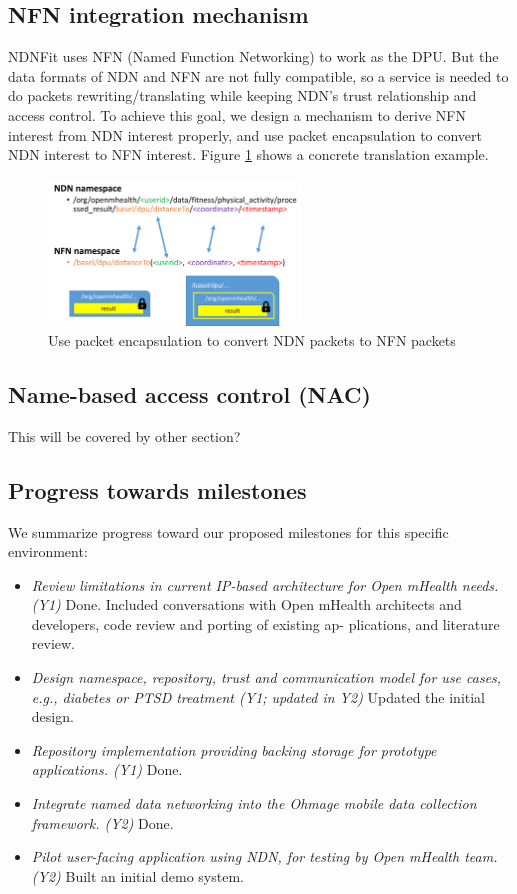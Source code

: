 \documentclass{article}
\begin{document}
\subsection{NFN integration mechanism}
NDNFit uses NFN (Named Function Networking) to work as the DPU. But the data formats of NDN and NFN are not fully compatible, so a service is needed to do packets rewriting/translating while keeping NDN’s trust relationship and access control. To achieve this goal, we design a mechanism to derive NFN interest from NDN interest properly, and use packet encapsulation to convert NDN interest to NFN interest. Figure \ref{fig:ndnnfn} shows a concrete translation example.

\begin{figure}
	\begin{center}
		\includegraphics[width=0.6\textwidth]{ndnnfn.png}
		\caption{Use packet encapsulation to convert NDN packets to NFN packets}
		\label{fig:ndnnfn}
	\end{center}
\end{figure}

\subsection{Name-based access control (NAC)}
This will be covered by other section?

\subsection{Progress towards milestones}
We summarize progress toward our proposed milestones for this specific environment:
\begin{itemize}
	\item \textit{Review limitations in current IP-based architecture for Open mHealth needs. (Y1)} Done. Included conversations with Open mHealth architects and developers, code review and porting of existing ap- plications, and literature review. 
	\item \textit{Design namespace, repository, trust and communication model for use cases, e.g., diabetes or PTSD treatment (Y1; updated in Y2)} Updated the initial design.
	\item \textit {Repository implementation providing backing storage for prototype applications. (Y1)} Done.
	\item \textit {Integrate named data networking into the Ohmage mobile data collection framework. (Y2)} Done.
	\item \textit {Pilot user-facing application using NDN, for testing by Open mHealth team. (Y2)} Built an initial demo system.
\end{itemize}
\end{document}

